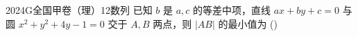 
\begin{problem}{2024}{G}{全国甲卷（理）}{12}{数列}
已知 $b$ 是 $a, c$ 的等差中项，直线 $ax+by+c=0$ 与圆 $x^2+y^2+4y-1=0$ 交于 $A, B$ 两点，则 $|AB|$ 的最小值为
(\hspace{1cm})
\begin{choices}
\end{choices}
\end{problem}